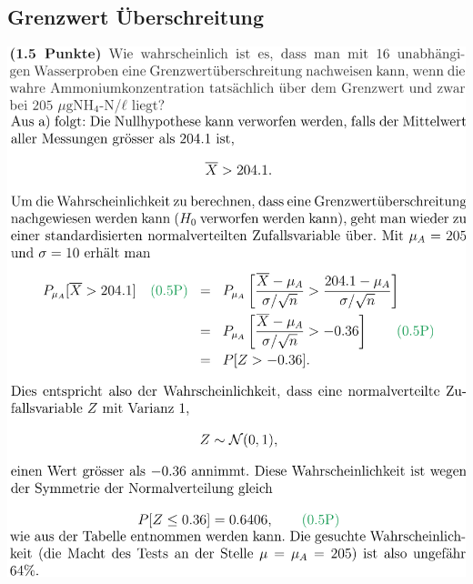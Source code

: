 \subsection{Grenzwert Überschreitung}
\includegraphics[width=\linewidth]{./Figures/Test_Ueberschreitung.png}

